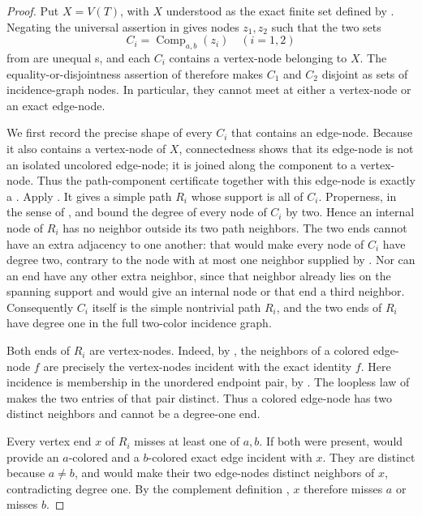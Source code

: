 \begin{proof}
Put $X=V(T)$, with $X$ understood as the exact finite set defined by
.  Negating the universal assertion in
 gives nodes $z_1,z_2$ such that the two sets
\[
 C_i=\operatorname{Comp}_{a,b}(z_i)\quad(i=1,2)
\]
from  are unequal
s, and each $C_i$ contains a vertex-node
belonging to $X$.  The equality-or-disjointness assertion of
 therefore makes $C_1$ and $C_2$
disjoint as sets of incidence-graph nodes.  In particular, they cannot
meet at either a vertex-node or an exact edge-node.

We first record the precise shape of every $C_i$ that contains an edge-node.
Because it also contains a vertex-node of $X$, connectedness shows that its
edge-node is not an isolated uncolored edge-node; it is joined along the
component to a vertex-node.  Thus the path-component certificate together
with this edge-node is exactly a
.  Apply
.  It gives a simple path $R_i$
whose support is all of $C_i$.  Properness, in the sense of
, and
 bound the degree of every node
of $C_i$ by two.  Hence an internal node of $R_i$ has no neighbor outside
its two path neighbors.  The two ends cannot have an extra adjacency to
one another: that would make every node of $C_i$ have degree two, contrary
to the node with at most one neighbor supplied by
.  Nor can an end have any other extra
neighbor, since that neighbor already lies on the spanning support and
would give an internal node or that end a third neighbor.  Consequently
$C_i$ itself is the simple nontrivial path $R_i$, and the two ends of
$R_i$ have degree one in the full two-color incidence graph.

Both ends of $R_i$ are vertex-nodes.  Indeed, by
, the neighbors of a colored edge-node
$f$ are precisely the vertex-nodes incident with the exact identity $f$.
Here incidence is membership in the unordered endpoint pair, by
.  The loopless law of 
makes the two entries of that pair distinct.  Thus a colored edge-node has
two distinct neighbors and cannot be a degree-one end.

Every vertex end $x$ of $R_i$ misses at least one of $a,b$.  If both were
present,  would provide an $a$-colored and a
$b$-colored exact edge incident with $x$.  They are distinct because
$a\ne b$, and  would make their two
edge-nodes distinct neighbors of $x$, contradicting degree one.  By the
complement definition , $x$ therefore misses $a$
or misses $b$.


\end{proof}
